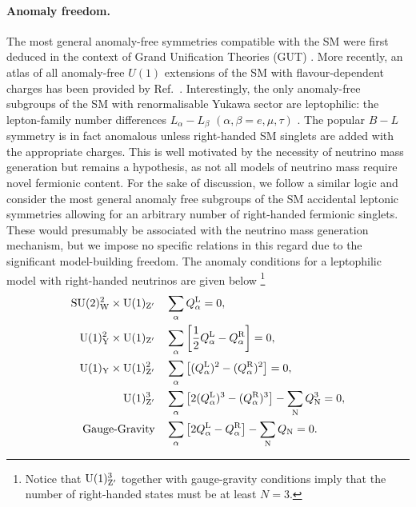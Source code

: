 \paragraph{Anomaly freedom.} The most general anomaly-free symmetries compatible with the SM were first deduced in the context of Grand Unification Theories (GUT) \cite{Barger:1982bj,Barr:1986hj}. More recently, an atlas of all anomaly-free $U(1)$ extensions of the SM with flavour-dependent charges has been provided by Ref.~\cite{Allanach:2018vjg}. Interestingly, the only anomaly-free subgroups of the SM with renormalisable Yukawa sector are leptophilic: the lepton-family number differences $L_\alpha -L_\beta$ $(\alpha,\beta=e,\mu,\tau)$ \cite{He:1990pn,He:1991qd}. The popular $B-L$ symmetry is in fact anomalous unless right-handed SM singlets are added with the appropriate charges. This is well motivated by the necessity of neutrino mass ge\-ne\-ra\-tion but remains a hypothesis, as not all models of neutrino mass require novel fermionic content. 
%
For the sake of discussion, we follow a similar logic and consider the most general anomaly free subgroups of the SM accidental leptonic symmetries allowing for an arbitrary number of right-handed fermionic singlets. These would presumably be associated with the neutrino mass generation mechanism, but we impose no specific relations in this regard due to the significant model-building freedom. The anomaly conditions for a leptophilic model with right-handed neutrinos are given below \cite{Ellis:2017nrp} \footnote{Notice that $\rm U(1)_{Z^\prime}^3$ together with gauge-gravity conditions imply that the number of right-handed states must be at least $N=3$.}
%
\begin{subequations}\label{eq:anom}
    \begin{align}
        {\rm SU(2)_W^2\times \rm U(1)_{Z^\prime}} & \quad\sum_\alpha Q_\alpha^{\rm L} = 0,\\
        {\rm U(1)_Y^2\times \rm U(1)_{Z^\prime}}& \quad\sum_\alpha\left[ \frac{1}{2}Q_\alpha^{\rm L} - Q_\alpha^{\rm R}\right]= 0,\\
        {\rm U(1)_Y\times \rm U(1)_{Z^\prime}^2} &  \quad\sum_\alpha \left[(Q_\alpha^{\rm L})^2 - (Q_\alpha^{\rm R})^2\right]= 0,\label{eq:YZp2}\\
        {\rm U(1)_{Z^\prime}^3} & \quad \sum_\alpha  \left[2 (Q_\alpha^{\rm L})^3 - (Q_\alpha^{\rm R})^3\right] - \sum_{\rm N}Q_{\rm N}^3= 0,\\
        \text{Gauge-Gravity} & \quad \sum_\alpha \left[2Q_\alpha^{\rm L} - Q_\alpha^{\rm R}\right] - \sum_{\rm N} Q_{\rm N} = 0.
    \end{align}
\end{subequations}
%

